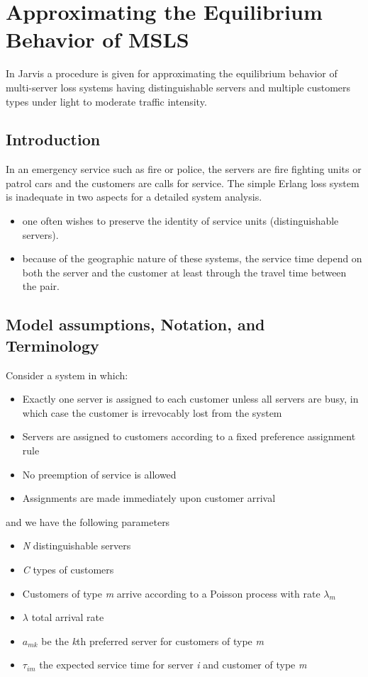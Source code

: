 
\chapter{Approximating the Equilibrium Behavior of MSLS}
In Jarvis \cite{jarvis1985approximating}
a procedure is given
for approximating the equilibrium behavior
of multi-server loss systems having distinguishable servers
and multiple customers types
under light to moderate traffic intensity.

\section{Introduction}
In an emergency service such as fire or police, 
the servers are fire fighting units or patrol cars
and the customers are calls for service.
The simple Erlang loss system
is inadequate in two aspects for a detailed system analysis.
\begin{itemize}
\item one often wishes
  to preserve the identity of service units (distinguishable servers).
\item because
  of the geographic nature of these systems,
  the service time depend on both
  the server and the customer
  at least through the travel time between the pair.
\end{itemize}

\section{Model assumptions, Notation, and Terminology}
Consider a system in which:
\begin{itemize}
\item Exactly one server
  is assigned to each customer
  unless all servers are busy, 
  in which case
  the customer is irrevocably lost from the system
\item Servers are assigned
  to customers according to a fixed preference assignment rule
\item No preemption of service is allowed
\item Assignments are made immediately
  upon customer arrival
\end{itemize}

and we have the following parameters
\begin{itemize}
\item \textit{N} distinguishable servers
\item \textit{C} types of customers
\item Customers of type \textit{m}
  arrive according to a Poisson process with rate $\lambda_{m}$
\item $\lambda$ total arrival rate
\item $a_{mk}$ be the \textit{k}th preferred server
  for customers of type \textit{m}
\item $\tau_{im}$ the expected service time
  for server \textit{i} and customer of type \textit{m}
\end{itemize}


